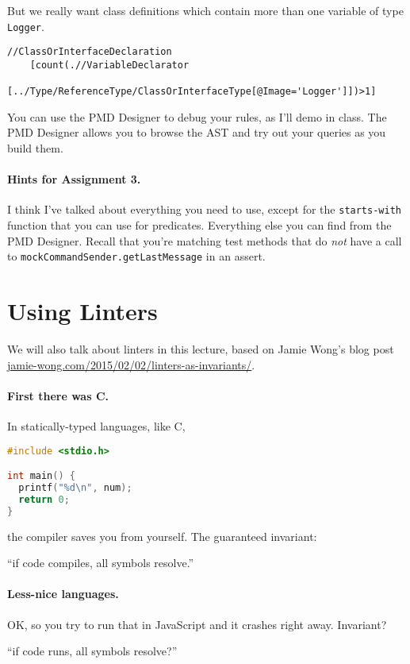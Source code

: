\documentclass[11pt]{article}
\begin{document}
But we really want class definitions which contain more than one 
variable of type {\tt Logger}. 
\noindent
{\small \begin{verbatim}
//ClassOrInterfaceDeclaration
    [count(.//VariableDeclarator
      [../Type/ReferenceType/ClassOrInterfaceType[@Image='Logger']])>1]
\end{verbatim}

You can use the PMD Designer to debug your rules, as I'll demo in class. The PMD Designer allows you to browse the AST and try out your queries as you build them.

\paragraph{Hints for Assignment 3.} I think I've talked about everything you need to use, except for the {\tt starts-with} function that you can use for predicates. Everything else you can find from the PMD Designer. Recall that you're matching test methods that do \emph{not} have a call to {\tt mockCommandSender.getLastMessage} in an assert.

\section*{Using Linters}
We will also talk about linters in this lecture, based on Jamie Wong's blog post \url{jamie-wong.com/2015/02/02/linters-as-invariants/}.

\paragraph{First there was C.}
In statically-typed languages, like C,
\begin{lstlisting}[language=C]
#include <stdio.h>

int main() {
  printf("%d\n", num);
  return 0;
}
\end{lstlisting}
the compiler saves you from yourself.
The guaranteed invariant:
\begin{center}
``if code compiles, all symbols resolve.''
\end{center}

\paragraph{Less-nice languages.}
OK, so you try to run that in JavaScript and it crashes right away.
Invariant?
\begin{center}
 ``if code runs, all symbols resolve?''
\end{center}

}
\end{document}
